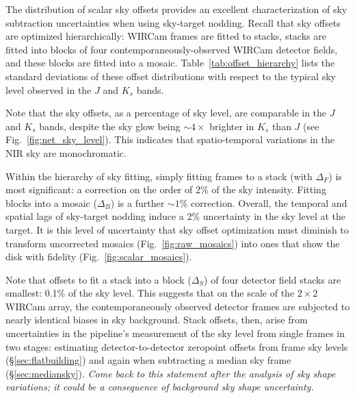 \documentclass[iop]{emulateapj}
\newcommand{\mycomment}[1]{\textcolor{OliveGreen}{\textit{#1}}} %
\newcommand{\Fig}[1]{Fig.~\ref{fig:#1}}  %
\newcommand{\Tab}[1]{Table~\ref{tab:#1}}  %
\newcommand{\Sec}[1]{\S\ref{sec:#1}}  %
\begin{document}
The distribution of scalar sky offsets provides an excellent characterization of sky subtraction uncertainties when using sky-target nodding.
Recall that sky offsets are optimized hierarchically: WIRCam frames are fitted to stacks, stacks are fitted into blocks of four contemporaneously-observed WIRCam detector fields, and these blocks are fitted into a mosaic.
\Tab{offset_hierarchy} lists the standard deviations of these offset distributions with respect to the typical sky level observed in the $J$ and $K_s$ bands.


Note that the sky offsets, as a percentage of sky level, are comparable in the $J$ and $K_s$ bands, despite the sky glow being $\sim 4\times$ brighter in $K_s$ than $J$ (see \Fig{net_sky_level}).
This indicates that spatio-temporal variations in the NIR sky are monochromatic.

Within the hierarchy of sky fitting, simply fitting frames to a stack (with $\Delta_F$) is most significant: a correction on the order of 2\% of the sky intensity.
Fitting blocks into a mosaic ($\Delta_B$) is a further $\sim 1$\% correction.
Overall, the temporal and spatial lags of sky-target nodding induce a 2\% uncertainty in the sky level at the target.
It is this level of uncertainty that sky offset optimization must diminish to transform uncorrected mosaics (\Fig{raw_mosaics}) into ones that show the disk with fidelity (\Fig{scalar_mosaics}).

Note that offsets to fit a stack into a block ($\Delta_S$) of four detector field stacks are smallest: 0.1\% of the sky level.
This suggests that on the scale of the $2\times 2$ WIRCam array, the contemporaneously observed detector frames are subjected to nearly identical biases in sky background.
Stack offsets, then, arise from uncertainties in the pipeline's measurement of the sky level from single frames in two stages: estimating detector-to-detector zeropoint offsets from frame sky levels (\Sec{flatbuilding}) and again when subtracting a median sky frame (\Sec{mediansky}).  \mycomment{Come back to this statement after the analysis of sky shape variations; it could be a consequence of background sky shape uncertainty.}
\end{document}
